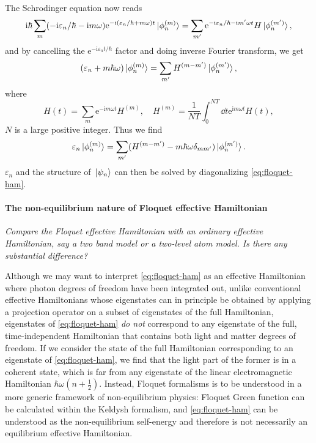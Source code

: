 \documentclass[hyperref, a4paper]{article}
\newcommand*{\ii}{\mathrm{i}}
\newcommand*{\ee}{\mathrm{e}}
\begin{document}
The Schrodinger equation now reads 
\[
    \ii \hbar \sum_m (- \ii \varepsilon_n / \hbar - \ii m \omega) 
    \ee^{- \ii (\varepsilon_n / \hbar + m \omega) t} \ket*{\phi_n^{(m)}}
    = \sum_{m'} \ee^{- \ii \varepsilon_n / \hbar - \ii m' \omega t} H \ket*{\phi_n^{(m')}},
\] 
and by cancelling the $\ee^{- \ii \varepsilon_n t / \hbar}$ factor 
and doing inverse Fourier transform, we get 
\begin{equation}
    (\varepsilon_n + m \hbar \omega) \ket*{\phi_n^{(m)}} 
    = \sum_{m'} H^{(m - m')} \ket*{\phi_n^{(m')}},
\end{equation}
where 
\begin{equation}
    H(t) = \sum_{m} \ee^{- \ii m \omega t} H^{(m)}, \quad 
    H^{(m)} = \frac{1}{N T} \int_{0}^{NT} \dd{t} \ee^{\ii m \omega t} H(t),
\end{equation}
$N$ is a large positive integer. Thus we find 
\begin{equation}
    \varepsilon_n \ket*{\phi^{(m)}_n}
    = \sum_{m'} (
        H^{(m - m')} - m \hbar \omega \delta_{m m'}
    ) \ket*{\phi^{(m')}_{n}}.
    \label{eq:floquet-ham}
\end{equation}
$\varepsilon_n$ and the structure of $\ket*{\psi_n}$ can then be solved 
by diagonalizing \eqref{eq:floquet-ham}.

\paragraph*{The non-equilibrium nature of Floquet effective Hamiltonian}
\textit{
    Compare the Floquet effective Hamiltonian with an ordinary effective Hamiltonian, 
    say a two band model or a two-level atom model.
    Is there any substantial difference?
}

Although we may want to interpret \eqref{eq:floquet-ham}
as an effective Hamiltonian where photon degrees of freedom 
have been integrated out,
unlike conventional effective Hamiltonians
whose eigenstates can in principle be obtained by 
applying a projection operator on a subset of eigenstates of the full Hamiltonian,
eigenstates of \eqref{eq:floquet-ham} 
\emph{do not} correspond to any eigenstate of 
the full, time-independent Hamiltonian that contains both light and matter degrees of freedom.
If we consider the state of the full Hamiltonian corresponding to 
an eigenstate of \eqref{eq:floquet-ham},
we find that the light part of the former is in a coherent state,
which is far from any eigenstate of the linear electromagnetic Hamiltonian 
$\hbar \omega (n + \frac{1}{2})$.
Instead, Floquet formalisms is to be understood in a more generic framework of non-equilibrium physics:
Floquet Green function can be calculated within the Keldysh formalism,
and \eqref{eq:floquet-ham} can be understood as the 
non-equilibrium self-energy \cite{lubatsch2019evolution,aoki2014nonequilibrium}
and therefore is not necessarily an equilibrium effective Hamiltonian.
\end{document}
